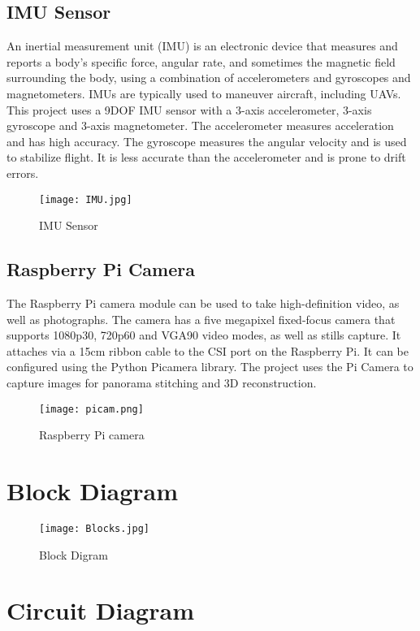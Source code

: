 \subsection{IMU Sensor}
An inertial measurement unit (IMU) is an electronic device that measures and reports a body's specific force, angular rate, and sometimes the magnetic field surrounding the body, using a combination of accelerometers and gyroscopes and magnetometers. IMUs are typically used to maneuver aircraft, including UAVs. This project uses a 9DOF IMU sensor with a 3-axis accelerometer, 3-axis gyroscope and 3-axis magnetometer. The accelerometer measures acceleration and has high accuracy. The gyroscope measures the angular velocity and is used to stabilize flight. It is less accurate than the accelerometer and is prone to drift errors. 
\begin{figure}[H]
  \centering
  \texttt{[image: IMU.jpg]}
  \caption{IMU Sensor}
  \label{IMU Sensor}	
\end{figure}

\subsection{Raspberry Pi Camera}
The Raspberry Pi camera module can be used to take high-definition video, as well as photographs. The camera has a five megapixel fixed-focus camera that supports 1080p30, 720p60 and VGA90 video modes, as well as stills capture. It attaches via a 15cm ribbon cable to the CSI port on the Raspberry Pi. It can be configured using the Python Picamera library. The project uses the Pi Camera to capture images for panorama stitching and 3D reconstruction.
\begin{figure}[H]
  \centering
  \texttt{[image: picam.png]}
  \caption{Raspberry Pi camera}
  \label{RPi camera}	
\end{figure}

\section{Block Diagram}

\begin{figure}[H]
  \centering
  \texttt{[image: Blocks.jpg]}
  \caption{Block Digram}
  \label{block}	
\end{figure}

\section{Circuit Diagram}

